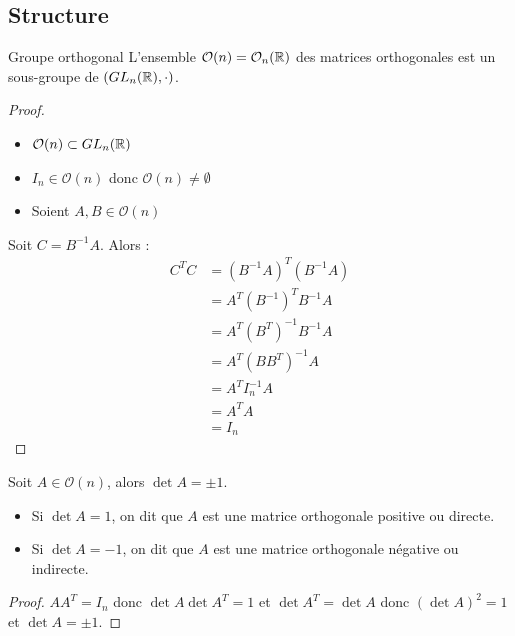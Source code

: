 \subsection{Structure}

\begin{theoreme}{Groupe orthogonal}{}
    L'ensemble $\mathcal O(n) = \mathcal O_n(\mathbb{R})$ des matrices orthogonales est un sous-groupe de $(GL_n(\mathbb{R}), \cdot)$.
\end{theoreme}

\begin{proof}
    \begin{itemize}
        \item $\mathcal O(n) \subset GL_n(\mathbb{R})$
        \item $I_n \in \mathcal O(n)$ donc $\mathcal O(n) \neq \emptyset$
        \item Soient $A, B \in \mathcal O(n)$
    \end{itemize}

    Soit $C = B^{-1} A$. Alors : 
    \begin{align}
        C^T C & = (B^{-1} A)^T (B^{-1} A) \\
        & = A^T (B^{-1})^T B^{-1} A \\
        & = A^T (B^T)^{-1} B^{-1} A \\
        & = A^T (B B^T)^{-1} A \\
        & = A^T I_n^{-1} A \\
        & = A^T A \\
        & = I_n
    \end{align}
\end{proof}


\lvspace 

\begin{proposition}{}{}
    Soit $A \in \mathcal O(n)$, alors $\det A = \pm 1$.

    \begin{itemize}
        \item Si $\det A= 1$, on dit que $A$ est une matrice orthogonale positive ou directe.
        \item Si $\det A = -1$, on dit que $A$ est une matrice orthogonale négative ou indirecte.
    \end{itemize}
\end{proposition}

\begin{proof}
    $A A^T = I_n$ donc $\det A \det A^T = 1$ et $\det A^T = \det A$ donc $(\det A)^2 = 1$ et $\det A = \pm 1$.
\end{proof}

